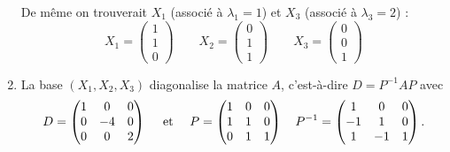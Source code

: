 \documentclass[11pt, class=report,crop=false]{standalone}
\begin{document}
\begin{exemple}
\begin{enumerate}
  
 De même on trouverait $X_1$ (associé à $\lambda_1 = 1$) et $X_3$ (associé à $\lambda_3 = 2$) :
 $$
 X_1 = \begin{pmatrix}1\\1\\0\end{pmatrix}\qquad
 X_2 = \begin{pmatrix}0\\1\\1\end{pmatrix}\qquad 
 X_3 = \begin{pmatrix}0\\0\\1\end{pmatrix}$$
 
  \item  
 La base $(X_1, X_2,X_3)$ diagonalise la matrice $A$, c'est-à-dire
 $D = P^{-1}AP$ avec  
$$D=\begin{pmatrix}1&0&0\cr0&-4&0\cr0&0&2\end{pmatrix} \quad \text{ et  } \quad 
P=\begin{pmatrix}
1 & 0 & 0 \\
1 & 1 & 0 \\
0 & 1 & 1
\end{pmatrix}
\quad
P^{-1}=\begin{pmatrix}
1 & 0 & 0 \\
-1 & 1 & 0 \\
1 & -1 & 1
\end{pmatrix}
.$$    
\end{enumerate}  
\end{exemple}
\end{document}

